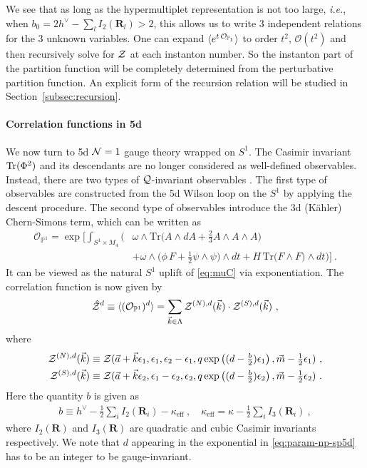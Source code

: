 \documentclass[letterpaper, 11pt]{article}
\def\IP{\mathbb{P}}
\def\CN{{\cal N}}
\def\CO{{\cal O}}
\def\CQ{{\cal Q}}
\def\CZ{{\cal Z}}
\def\e{\epsilon}
\def\half{\frac{1}{2}}
\def\Tr{{\rm Tr}}
\begin{document}
We see that as long as the hypermultiplet representation is not too large, \emph{i.e.}, when $b_0 = 2h^\vee - \sum_l I_2(\mathbf{R}_l) > 2$, this allows us to write 3 independent relations for the 3 unknown variables. One can expand $\langle e^{t \, \CO_{\IP_1}}\rangle$ to order $t^2$, $\mathcal{O}(t^2)$ and then recursively solve for $\CZ$ at each instanton number. So the instanton part of the partition function will be completely determined from the perturbative partition function. An explicit form of the recursion relation will be studied in Section~\ref{subsec:recursion}.

\paragraph{Correlation functions in 5d}
We now turn to 5d $\CN=1$ gauge theory wrapped on $S^1$. The Casimir invariant $\Tr (\Phi^2)$ and its descendants are no longer considered as well-defined observables. Instead, there are two types of $\CQ$-invariant observables \cite{Baulieu:1997nj}. The first type of observables are constructed from the 5d Wilson loop on the $S^1$ by applying the descent procedure. The second type of observables introduce the 3d (K\"ahler) Chern-Simons term, which can be written as \cite{Losev:1995cr,Baulieu:1997nj}
\begin{align} 
  \mathcal{O}_{\IP^1} = \exp\bigg[
    \int_{S^1 \times M_4} \bigg( & \omega \wedge \text{Tr}\Big(A \wedge dA + \frac{2}{3}A\wedge A \wedge A \Big) \\ \nonumber
     & + \omega \wedge \Big( \phi \, F + \frac{1}{2}\psi \wedge \psi \Big)\wedge dt + H\, \text{Tr}\Big( F \wedge F \Big) \wedge dt \bigg)
     \bigg] \ .
\end{align}
It can be viewed as the natural $S^1$ uplift of \eqref{eq:muC} via exponentiation. The correlation function is now given by
\begin{align}
  \label{eq:cor5d}
  \hat{\CZ}^{d} \equiv \langle (\mathcal{O}_{\IP^1})^{d}\rangle = \sum_{\vec{k} \in \Lambda}  \CZ^{(N),d}(\vec{k}) \cdot \CZ^{(S),d}(\vec{k}) \ , 
\end{align} 
where
\begin{align}
  \label{eq:param-np-sp5d}
\begin{split}
  \CZ^{(N),d}(\vec{k}) &\equiv \CZ(\vec{a}+\vec{k} \e_1, \e_1, \e_2-\e_1, q \exp \left((d - \tfrac{b}{2})\e_1 \right), \vec{m} -\tfrac{1}{2}\e_1) \ , \\
  \CZ^{(S),d}(\vec{k}) &\equiv \CZ(\vec{a}+\vec{k} \e_2, \e_1 - \e_2, \e_2, q \exp \left( (d - \tfrac{b}{2})\e_2\right), \vec{m} -\tfrac{1}{2}\e_2)\ . 
\end{split}
\end{align}
Here the quantity $b$ is given as 
\begin{align}
 b \equiv h^\vee - \frac{1}{2} \sum_i I_2(\mathbf{R}_i) - \kappa_{\textrm{eff}} \ , \quad \kappa_{\textrm{eff}} = \kappa - \half \sum_i I_3(\mathbf{R}_i) \ , 
\end{align}
where $I_2(\mathbf{R})$ and $I_3(\mathbf{R})$ are quadratic and cubic Casimir invariants respectively. 
We note that $d$ appearing in the exponential in \eqref{eq:param-np-sp5d} has to be an integer to be gauge-invariant.
\end{document}
